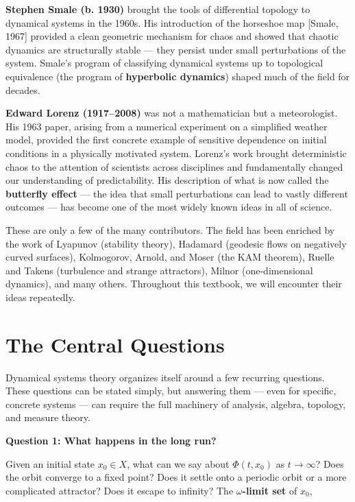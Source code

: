 \textbf{Stephen Smale (b. 1930)} brought the tools of differential topology to dynamical systems in the 1960s. His introduction of the horseshoe map [Smale, 1967] provided a clean geometric mechanism for chaos and showed that chaotic dynamics are structurally stable --- they persist under small perturbations of the system. Smale's program of classifying dynamical systems up to topological equivalence (the program of \textbf{hyperbolic dynamics}) shaped much of the field for decades.

\textbf{Edward Lorenz (1917--2008)} was not a mathematician but a meteorologist. His 1963 paper, arising from a numerical experiment on a simplified weather model, provided the first concrete example of sensitive dependence on initial conditions in a physically motivated system. Lorenz's work brought deterministic chaos to the attention of scientists across disciplines and fundamentally changed our understanding of predictability. His description of what is now called the \textbf{butterfly effect} --- the idea that small perturbations can lead to vastly different outcomes --- has become one of the most widely known ideas in all of science.

These are only a few of the many contributors. The field has been enriched by the work of Lyapunov (stability theory), Hadamard (geodesic flows on negatively curved surfaces), Kolmogorov, Arnold, and Moser (the KAM theorem), Ruelle and Takens (turbulence and strange attractors), Milnor (one-dimensional dynamics), and many others. Throughout this textbook, we will encounter their ideas repeatedly.


\section{The Central Questions}\label{sec:1.6}

Dynamical systems theory organizes itself around a few recurring questions. These questions can be stated simply, but answering them --- even for specific, concrete systems --- can require the full machinery of analysis, algebra, topology, and measure theory.

\textbf{Question 1: What happens in the long run?}

Given an initial state $x_0 \in X$, what can we say about $\Phi(t, x_0)$ as $t \to \infty$? Does the orbit converge to a fixed point? Does it settle onto a periodic orbit or a more complicated attractor? Does it escape to infinity? The \textbf{$\omega$-limit set} of $x_0$,

